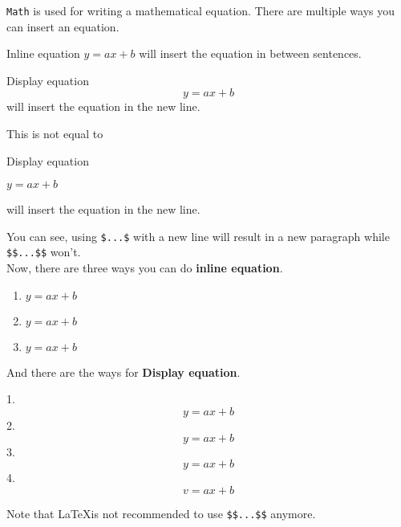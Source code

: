 \documentclass{article}
\begin{document}
\verb!Math! is used for writing a mathematical equation.
There are multiple ways you can insert an equation.

Inline equation $y = ax + b$ will insert the equation in between sentences.

Display equation $$y = ax + b$$ will insert the equation in the new line.

This is not equal to

Display equation 

$y = ax + b$

will insert the equation in the new line.

You can see, using \verb!$...$! with a new line will result in a new paragraph 
while \verb!$$...$$! won't. \\

Now, there are three ways you can do \textbf{inline equation}.

\begin{enumerate}
    \item $y = ax + b$
    \item \begin{math}
        y = ax + b
    \end{math}
    \item \(y = ax + b\)
\end{enumerate}

And there are the ways for \textbf{Display equation}.

1. 
$$ y = ax + b$$
2.
\[ y = ax + b\]
3.
\begin{displaymath}
    y = ax + b
\end{displaymath}
4.
\begin{equation}
    v = ax + b
\end{equation}

Note that \LaTeX is not recommended to use \verb!$$...$$! anymore.
\end{document}
